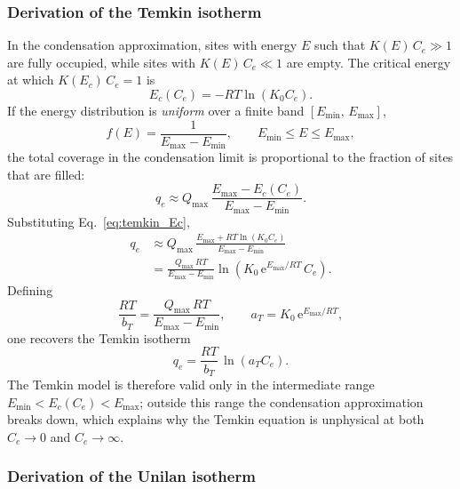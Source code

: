 \documentclass[12pt]{article}
\begin{document}
	\subsubsection{Derivation of the Temkin isotherm}

	In the condensation approximation, sites with energy $E$ such that
	$K(E)\,C_e \gg 1$ are fully occupied, while sites with
	$K(E)\,C_e \ll 1$ are empty. The critical energy at which
	$K(E_c)\,C_e = 1$ is
	\begin{equation}
		E_c(C_e) = -RT\ln(K_0 C_e).
		\label{eq:temkin_Ec}
	\end{equation}
	If the energy distribution is \emph{uniform} over a finite band
	$[E_{\min},\, E_{\max}]$,
	\begin{equation}
		f(E) = \frac{1}{E_{\max} - E_{\min}},
		\qquad E_{\min} \leq E \leq E_{\max},
		\label{eq:temkin_fE}
	\end{equation}
	the total coverage in the condensation limit is proportional to the
	fraction of sites that are filled:
	\begin{equation}
		q_e \approx Q_{\max}\,
		\frac{E_{\max} - E_c(C_e)}{E_{\max} - E_{\min}}.
	\end{equation}
	Substituting Eq.~\eqref{eq:temkin_Ec},
	\begin{align}
		q_e
		&\approx Q_{\max}\,
		\frac{E_{\max} + RT\ln(K_0 C_e)}{E_{\max} - E_{\min}}
		\nonumber\\
		&= \frac{Q_{\max}\,RT}{E_{\max} - E_{\min}}
		\ln\!\left(K_0\, \mathrm{e}^{E_{\max}/RT}\, C_e\right).
	\end{align}
	Defining
	\begin{equation}
		\frac{RT}{b_T} = \frac{Q_{\max}\,RT}{E_{\max} - E_{\min}},
		\qquad
		a_T = K_0\, \mathrm{e}^{E_{\max}/RT},
	\end{equation}
	one recovers the Temkin isotherm
	\begin{equation}
		\boxed{q_e = \frac{RT}{b_T}\,\ln(a_T C_e).}
	\end{equation}
	The Temkin model is therefore valid only in the intermediate range
	$E_{\min} < E_c(C_e) < E_{\max}$; outside this range the
	condensation approximation breaks down, which explains why the
	Temkin equation is unphysical at both $C_e \to 0$ and
	$C_e \to \infty$.

	\subsubsection{Derivation of the Unilan isotherm}
\end{document}

